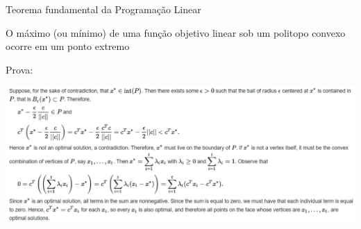 \documentclass[compress,mathserif]{beamer}
\begin{document}
\begin{frame}{Teorema fundamental da Programação Linear}

O máximo (ou mínimo) de uma função objetivo linear sob um politopo convexo ocorre em um ponto extremo 

\vspace{0.5cm}

Prova: \href{https://en.wikipedia.org/wiki/Fundamental_theorem_of_linear_programming}{} 

\centering\includegraphics[width=\linewidth]{images/teorema_fundamental.png}

\end{frame}

\end{document}
